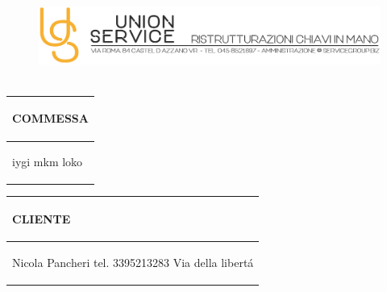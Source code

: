 \documentclass[a4paper]{article}
\begin{document}
                                \begin{figure}[!t]
                                \includegraphics[width=15.8cm, height=3cm]{intestazioneAlta2.jpg}
                                \end{figure}

                                \noindent\begin{tabular}{| L{72.2mm} |}
                                    \hline
                                    \vspace{2.5mm}
                                    \begin{spacing}{0}
                                    \textbf{COMMESSA}
                                    \end{spacing}\\
                                    \hline
                                    \vspace{4mm}
                                    \begin{spacing}{1.2}

                                iygi \newline mkm \newline loko
                                  \end{spacing}\\
                                    \hline
                                  \end{tabular}
                                  \quad
                                  \begin{tabular}{ | R{72.2mm} | }
                                    \hline
                                    \vspace{2.5mm}
                                    \begin{spacing}{0}
                                    \textbf{CLIENTE}
                                    \end{spacing}\\
                                    \hline
                                    \vspace{4mm}
                                    \begin{spacing}{1.2}

                               Nicola Pancheri \newline tel. 3395213283 \newline Via della libert\'a
                                  \end{spacing}\\
                                    \hline
                                  \end{tabular}
\end{document}
